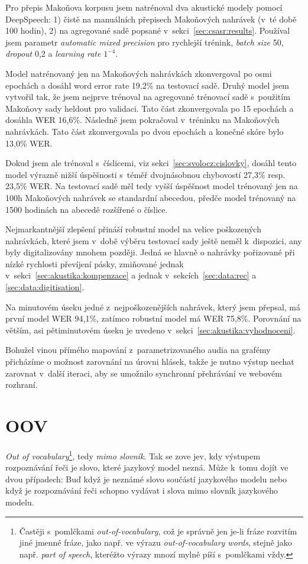 Pro přepis Makoňova korpusu jsem natrénoval dva akustické modely pomocí DeepSpeech:
1) čistě na manuálních přepisech
Makoňových nahrávek (v~té době 100 hodin), 2) na agregované sadě popsané
v~sekci~\ref{sec:csasr:results}. Používal jsem parametr \textit{automatic mixed
precision} pro rychlejší trénink, \textit{batch size} 50, \textit{dropout} 0,2 a
\textit{learning rate} $1^{-4}$.

Model natrénovaný jen na Makoňových nahrávkách zkonvergoval po osmi epochách a
dosáhl word error rate 19,2\% na testovací sadě. Druhý model jsem vytvořil tak,
že jsem nejprve trénoval na agregované trénovací sadě s~použitím Makoňovy
sady heldout pro validaci. Tato část zkonvergovala po 15 epochách a dosáhla WER
16,6\%. Následně jsem pokračoval v~tréninku na Makoňových nahrávkách. Tato část
zkonvergovala po dvou epochách a konečné skóre bylo 13,0\% WER.

Dokud jsem ale trénoval s~číslicemi, viz sekci~\ref{sec:svolocz:cislovky},
dosáhl tento model výrazně nižší úspěšnosti s~téměř dvojnásobnou chybovostí
27,3\% resp. 23,5\% WER.
Na testovací sadě měl tedy vyšší úspěšnost model trénovaný jen na 100h Makoňových
nahrávek se standardní abecedou, předče model trénovaný na 1500 hodinách na
abecedě rozšířené o číslice.


Nejmarkantnější zlepšení přináší robustní model na velice poškozených nahrávkách, které jsem
v~době výběru testovací sady ještě neměl k~dispozici, any byly digitalizovány
mnohem později. Jedná se hlavně o nahrávky pořizované při nízké rychlosti
převíjení pásky, zmiňované jednak v~sekci~\ref{sec:akustika:kompenzace} a jednak
v~sekcích~\ref{sec:data:rec} a \ref{sec:data:digitisation}.

Na minutovém úseku jedné z~nejpoškozenějších nahrávek, který jsem
přepsal, má první model WER 94,1\%, zatímco robustní model má WER
75,8\%. Porovnání na větším, asi pětiminutovém úseku je uvedeno
v~sekci~\ref{sec:akustika:vyhodnoceni}.

Bohužel vinou přímého mapování z~parametrizovaného audia na grafémy přicházíme o
možnost zarovnání na úrovni hlásek, takže je nutno výstup nechat zarovnat
v~další iteraci, aby se umožnilo synchronní přehrávání ve webovém rozhraní.

\section{OOV}

{\em{}Out of vocabulary}\footnote{Častěji s~pomlčkami {\em out-of-vocabulary},
což je správně jen je-li fráze rozvitím jiné jmenné fráze, jako např. ve výrazu {\em
out-of-vocabulary words}, stejně jako např. {\em part of speech}, kteréžto
výrazy mnozí mylně píší s~pomlčkami vždy.}, tedy {\em mimo slovník}. Tak se zove
jev, kdy výstupem rozpoznávání řeči je slovo, které jazykový model nezná. Může
k~tomu dojít ve dvou případech: Buď když je neznámé slovo součástí jazykového
modelu nebo když je rozpoznávání řeči schopno vydávat i slova mimo slovník
jazykového modelu.

